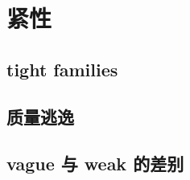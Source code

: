 \section{紧性}
\label{b1:sec:1203}


\subsection{tight families}
\label{b1:subsec:120301}

\subsection{质量逃逸}
\label{b1:subsec:120302}

\subsection{vague 与 weak 的差别}
\label{b1:subsec:120303}


